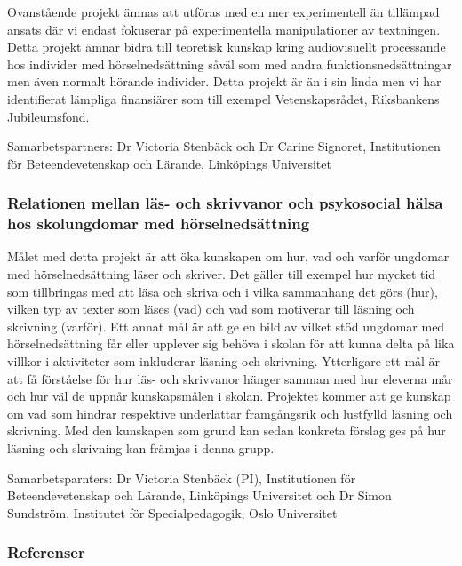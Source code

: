 \documentclass[]{article}
\begin{document}
Ovanstående projekt ämnas att utföras med en mer experimentell än
tillämpad ansats där vi endast fokuserar på experimentella
manipulationer av textningen. Detta projekt ämnar bidra till teoretisk
kunskap kring audiovisuellt processande hos individer med
hörselnedsättning såväl som med andra funktionsnedsättningar men även
normalt hörande individer. Detta projekt är än i sin linda men vi har
identifierat lämpliga finansiärer som till exempel Vetenskapsrådet,
Riksbankens Jubileumsfond.

Samarbetspartners: Dr Victoria Stenbäck och Dr Carine Signoret,
Institutionen för Beteendevetenskap och Lärande, Linköpings Universitet

\hypertarget{relationen-mellan-luxe4s--och-skrivvanor-och-psykosocial-huxe4lsa-hos-skolungdomar-med-huxf6rselnedsuxe4ttning}{%
\subsubsection{Relationen mellan läs- och skrivvanor och psykosocial
hälsa hos skolungdomar med
hörselnedsättning}\label{relationen-mellan-luxe4s--och-skrivvanor-och-psykosocial-huxe4lsa-hos-skolungdomar-med-huxf6rselnedsuxe4ttning}}

Målet med detta projekt är att öka kunskapen om hur, vad och varför
ungdomar med hörselnedsättning läser och skriver. Det gäller till
exempel hur mycket tid som tillbringas med att läsa och skriva och i
vilka sammanhang det görs (hur), vilken typ av texter som läses (vad)
och vad som motiverar till läsning och skrivning (varför). Ett annat mål
är att ge en bild av vilket stöd ungdomar med hörselnedsättning får
eller upplever sig behöva i skolan för att kunna delta på lika villkor i
aktiviteter som inkluderar läsning och skrivning. Ytterligare ett mål är
att få förståelse för hur läs- och skrivvanor hänger samman med hur
eleverna mår och hur väl de uppnår kunskapsmålen i skolan. Projektet
kommer att ge kunskap om vad som hindrar respektive underlättar
framgångsrik och lustfylld läsning och skrivning. Med den kunskapen som
grund kan sedan konkreta förslag ges på hur läsning och skrivning kan
främjas i denna grupp.

Samarbetsparnters: Dr Victoria Stenbäck (PI), Institutionen för
Beteendevetenskap och Lärande, Linköpings Universitet och Dr Simon
Sundström, Institutet för Specialpedagogik, Oslo Universitet

\hypertarget{referenser}{%
\subsubsection{Referenser}\label{referenser}}
\end{document}

